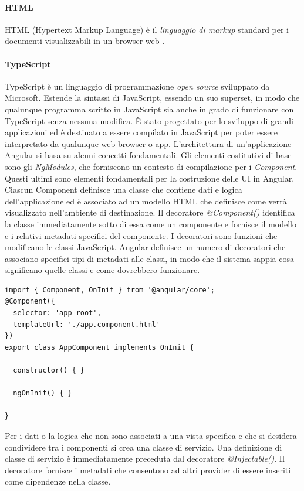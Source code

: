 \paragraph{HTML} HTML (Hypertext Markup Language) è il \textit{linguaggio di markup} standard per i documenti visualizzabili in un browser web \cite{HTML}.
\paragraph{TypeScript} TypeScript è un linguaggio di programmazione \textit{open source} sviluppato da Microsoft. Estende la sintassi di JavaScript, essendo un suo superset, in modo che qualunque programma scritto in JavaScript sia anche in grado di funzionare con TypeScript senza nessuna modifica. È stato progettato per lo sviluppo di grandi applicazioni ed è destinato a essere compilato in JavaScript per poter essere interpretato da qualunque web browser o app. \cite{TYPESCRIPT}
L'architettura di un'applicazione Angular si basa su alcuni concetti fondamentali. Gli elementi costitutivi di base sono gli \textit{NgModules}, che forniscono un contesto di compilazione per i \textit{Component}. Questi ultimi sono elementi fondamentali per la costruzione delle UI in Angular. Ciascun Component definisce una classe che contiene dati e logica dell'applicazione ed è associato ad un modello HTML che definisce come verrà visualizzato nell'ambiente di destinazione. Il decoratore \textit{@Component()} identifica la classe immediatamente sotto di essa come un componente e fornisce il modello e i relativi metadati specifici del componente.
I decoratori sono funzioni che modificano le classi JavaScript. Angular definisce un numero di decoratori che associano specifici tipi di metadati alle classi, in modo che il sistema sappia cosa significano quelle classi e come dovrebbero funzionare.\cite{ANGULAR}
\begin{lstlisting}[caption={Esempio di un Component in Angular}, style=javaScriptCode]
import { Component, OnInit } from '@angular/core';
@Component({
  selector: 'app-root',
  templateUrl: './app.component.html'
})
export class AppComponent implements OnInit {

  constructor() { }

  ngOnInit() { }

}
\end{lstlisting}
Per i dati o la logica che non sono associati a una vista specifica e che si desidera condividere tra i componenti si crea una classe di servizio. Una definizione di classe di servizio è immediatamente preceduta dal decoratore \textit{@Injectable()}. Il decoratore fornisce i metadati che consentono ad altri provider di essere inseriti come dipendenze nella classe.
